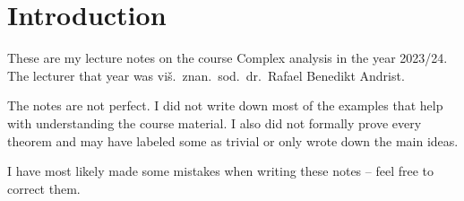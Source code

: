 \section*{Introduction}

These are my lecture notes on the course Complex analysis in the
year 2023/24. The lecturer that year was viš.~znan.~sod.~dr.~Rafael
Benedikt Andrist.

The notes are not perfect. I did not write down most of the examples
that help with understanding the course material. I also did not
formally prove every theorem and may have labeled some as trivial or
only wrote down the main ideas.

I have most likely made some mistakes when writing these notes --
feel free to correct them.
